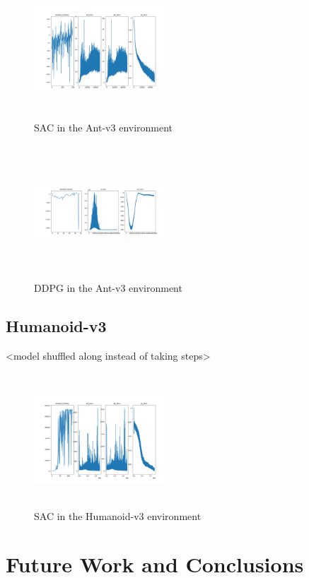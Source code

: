 \documentclass[conference]{IEEEtran}
\begin{document}
\begin{figure}
    \includegraphics[width=0.45\textwidth, height=5cm]{sac-ant}
    \caption{SAC in the Ant-v3 environment}
\end{figure}

\begin{figure}
    \includegraphics[width=0.45\textwidth, height=5cm]{ddpg-ant}
    \caption{DDPG in the Ant-v3 environment}
\end{figure}

\blindtext

\subsection{Humanoid-v3}

<model shuffled along instead of taking steps>

\begin{figure}
    \includegraphics[width=0.45\textwidth, height=5cm]{sac-humanoid}
    \caption{SAC in the Humanoid-v3 environment}
\end{figure}

\blindtext

\section{Future Work and Conclusions}

\blindtext[2]




\end{document}
